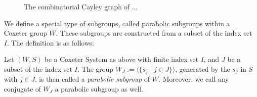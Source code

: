 \begin{figure}[ht]
    \caption{The combinatorial Cayley graph of ...}
    \label{fig:cayleygraphs}
    
    \centering
\end{figure}

We define a special type of subgroups, called parabolic subgroups within a Coxeter group \(W\).
These subgroups are constructed from a subset of the index set \(I\).
The definition is as follows:

\begin{definition}
    Let \((W,S)\) be a Coxeter System as above with finite index set \(I\), and \(J\) be a subset of the index set \(I\).
    The group \(W_J := \langle\{s_j \;\vert\; j\in J\}\rangle\), generated by the \(s_j\) in \(S\) with \(j \in J\), is then called a \emph{parabolic subgroup} of \(W\).
    Moreover, we call any conjugate of \(W_J\) a parabolic subgroup as well.
\end{definition}


